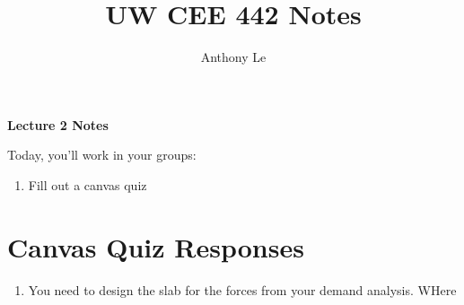 \documentclass{report} %
\title{UW CEE 442 Notes}
\author{Anthony Le}
\begin{document}
\pagestyle{fancy}
\fancyhead{}

\begin{center}
    \LARGE{\textbf{Lecture 2 Notes}}
\end{center}


Today, you'll work in your groups:
\begin{enumerate}
    \item Fill out a canvas quiz
\end{enumerate}

\section*{Canvas Quiz Responses}
\begin{enumerate}
    \item You need to design the slab for the forces from your demand analysis. WHere 
\end{enumerate}
\end{document}
